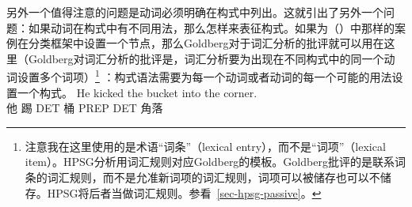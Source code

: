 \begin{exe}
\begin{xlist}[iv.]
\begin{exe}
\begin{xlist}[iv.]

\addlines
另外一个值得注意的问题是动词必须明确在构式中列出。这就引出了另外一个问题：如果动词在构式中有不同用法，那么怎样来表征构式。如果为（）中那样的案例在分类框架中设置一个节点，那么Goldberg对于词汇分析的批评就可以用在这里（Goldberg对词汇分析的批评是，词汇分析要为出现在不同构式中的同一个动词设置多个词项）\footnote{
    注意我在这里使用的是术语“词条”（lexical entry），而不是“词项”（lexical item）。HPSG分析用词汇规则对应Goldberg的模板。Goldberg批评的是联系词条的词汇规则，而不是允准新词项的词汇规则，词项可以被储存也可以不储存。HPSG将后者当做词汇规则。参看~\ref{sec-hpsg-passive}。%
} ：构式语法需要为每一个动词或者动词的每一个可能的用法设置一个构式。
\ea
\gll He kicked the bucket into the corner.\\
     他 踢 DET 桶 PREP DET 角落\\

\end{xlist}
\end{exe}
\end{xlist}
\end{exe}
